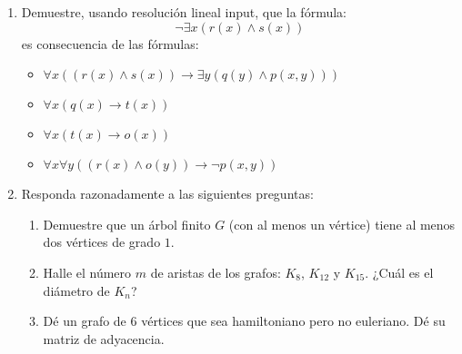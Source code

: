 \documentclass[10pt,spanish]{article}
\begin{document}
\begin{flushleft}
\begin{enumerate}
\item Demuestre, usando resolución lineal input, que la
  fórmula:
  \begin{equation*}
    \neg\exists x(r(x)\wedge s(x)) 
  \end{equation*}
  es consecuencia de las fórmulas:
  \begin{itemize}
  \item $\forall x((r(x)\wedge s(x))\to\exists y(q(y)\wedge p(x,y)))$
  \item $\forall x(q(x)\to t(x))$
  \item $\forall x(t(x)\to o(x))$
  \item $\forall x\forall y((r(x)\wedge o(y))\to\neg p(x,y))$
  \end{itemize}
\item Responda razonadamente a las siguientes preguntas:
  \begin{enumerate}
  \item Demuestre que un árbol finito $G$ (con al menos un vértice)
    tiene al menos dos vértices de grado $1$. 
  \item Halle el número $m$ de aristas de los grafos: $K_{8}$,
    $K_{12}$ y $K_{15}$. ¿Cuál es el diámetro de $K_{n}$? %
  \item Dé un grafo de $6$ vértices que sea hamiltoniano pero no
    euleriano. Dé su matriz de adyacencia. %
  \end{enumerate}
\end{enumerate}
\end{flushleft}
\end{document}
